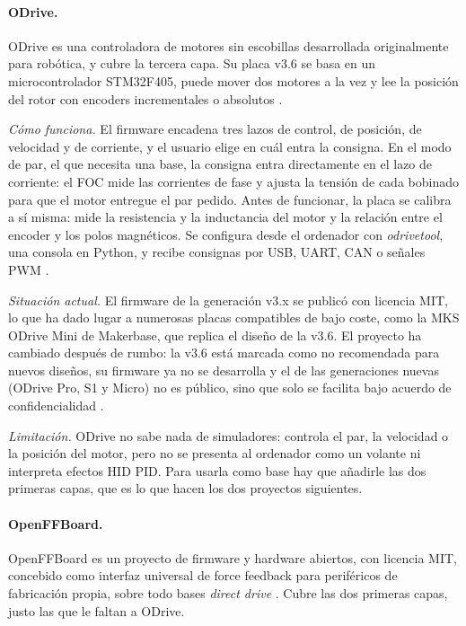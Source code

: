 

\paragraph{ODrive.}
ODrive es una controladora de motores sin escobillas desarrollada originalmente para robótica, y cubre la tercera capa. Su placa v3.6 se basa en un microcontrolador STM32F405, puede mover dos motores a la vez y lee la posición del rotor con encoders incrementales o absolutos \parencite{odrive_github}.

\textit{Cómo funciona.} El firmware encadena tres lazos de control, de posición, de velocidad y de corriente, y el usuario elige en cuál entra la consigna. En el modo de par, el que necesita una base, la consigna entra directamente en el lazo de corriente: el FOC mide las corrientes de fase y ajusta la tensión de cada bobinado para que el motor entregue el par pedido. Antes de funcionar, la placa se calibra a sí misma: mide la resistencia y la inductancia del motor y la relación entre el encoder y los polos magnéticos. Se configura desde el ordenador con \textit{odrivetool}, una consola en Python, y recibe consignas por USB, UART, CAN o señales PWM \parencite{odrive_github}.

\textit{Situación actual.} El firmware de la generación v3.x se publicó con licencia MIT, lo que ha dado lugar a numerosas placas compatibles de bajo coste, como la MKS ODrive Mini de Makerbase, que replica el diseño de la v3.6. El proyecto ha cambiado después de rumbo: la v3.6 está marcada como no recomendada para nuevos diseños, su firmware ya no se desarrolla y el de las generaciones nuevas (ODrive Pro, S1 y Micro) no es público, sino que solo se facilita bajo acuerdo de confidencialidad \parencite{odrive_github}.

\textit{Limitación.} ODrive no sabe nada de simuladores: controla el par, la velocidad o la posición del motor, pero no se presenta al ordenador como un volante ni interpreta efectos HID PID. Para usarla como base hay que añadirle las dos primeras capas, que es lo que hacen los dos proyectos siguientes.

\paragraph{OpenFFBoard.}
OpenFFBoard es un proyecto de firmware y hardware abiertos, con licencia MIT, concebido como interfaz universal de force feedback para periféricos de fabricación propia, sobre todo bases \textit{direct drive} \parencite{openffboard_github}. Cubre las dos primeras capas, justo las que le faltan a ODrive.

